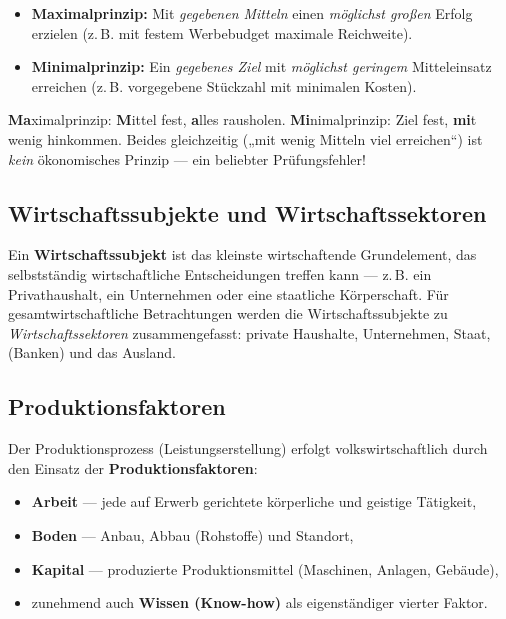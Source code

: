 \documentclass[11pt, a4paper]{article}
\begin{document}
\begin{itemize}
  \item \textbf{Maximalprinzip:} Mit \emph{gegebenen Mitteln} einen \emph{möglichst großen}
    Erfolg erzielen (z.\,B. mit festem Werbebudget maximale Reichweite).
  \item \textbf{Minimalprinzip:} Ein \emph{gegebenes Ziel} mit \emph{möglichst geringem}
    Mitteleinsatz erreichen (z.\,B. vorgegebene Stückzahl mit minimalen Kosten).
\end{itemize}

\begin{eselsbruecke}
\textbf{Ma}ximalprinzip: \textbf{M}ittel fest, \textbf{a}lles rausholen.
\textbf{Mi}nimalprinzip: Ziel fest, \textbf{mi}t wenig hinkommen.
Beides gleichzeitig („mit wenig Mitteln viel erreichen``) ist \emph{kein} ökonomisches
Prinzip --- ein beliebter Prüfungsfehler!
\end{eselsbruecke}

\subsection{Wirtschaftssubjekte und Wirtschaftssektoren}

Ein \textbf{Wirtschaftssubjekt} ist das kleinste wirtschaftende Grundelement, das
selbstständig wirtschaftliche Entscheidungen treffen kann --- z.\,B. ein Privathaushalt,
ein Unternehmen oder eine staatliche Körperschaft. Für gesamtwirtschaftliche Betrachtungen
werden die Wirtschaftssubjekte zu \emph{Wirtschaftssektoren} zusammengefasst: private
Haushalte, Unternehmen, Staat, (Banken) und das Ausland.

\subsection{Produktionsfaktoren}

Der Produktionsprozess (Leistungserstellung) erfolgt volkswirtschaftlich durch den Einsatz
der \textbf{Produktionsfaktoren}:

\begin{itemize}
  \item \textbf{Arbeit} --- jede auf Erwerb gerichtete körperliche und geistige Tätigkeit,
  \item \textbf{Boden} --- Anbau, Abbau (Rohstoffe) und Standort,
  \item \textbf{Kapital} --- produzierte Produktionsmittel (Maschinen, Anlagen, Gebäude),
  \item zunehmend auch \textbf{Wissen (Know-how)} als eigenständiger vierter Faktor.
\end{itemize}
\end{document}
